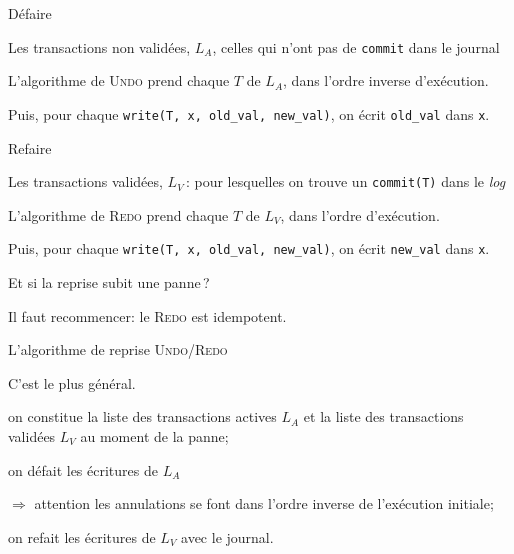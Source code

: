 \documentclass[aspectratio=169, handout]{beamer} %
\begin{document}
\begin{frame}{Défaire}

Les transactions non validées, $L_A$,  celles qui n'ont pas
de \texttt{commit} dans le journal

\vfill

L'algorithme de \textsc{Undo} prend chaque $T$ de $L_A$, 
\alert{dans l'ordre inverse d'exécution}.

\vfill

Puis, pour chaque \texttt{write(T, x, old\_val, new\_val)}, on écrit
\texttt{old\_val} dans \texttt{x}.

\end{frame}

\begin{frame}{Refaire}

Les transactions validées, $L_V$\,: 
pour lesquelles on trouve un \texttt{commit(T)} dans le \textit{log}

\vfill

L'algorithme de \textsc{Redo} prend chaque $T$ de $L_V$, 
\alert{dans l'ordre d'exécution}.

\vfill

Puis, pour chaque \texttt{write(T, x, old\_val, new\_val)}, on écrit
\texttt{new\_val} dans \texttt{x}.

\vfill

\begin{blocgauche}
Et si la reprise subit une panne\,?

\smallskip

 Il faut recommencer:
le \textsc{Redo} est \alert{idempotent}.
\end{blocgauche}
\end{frame}





\begin{frame}{L'algorithme de reprise \textsc{Undo/Redo}}

C'est le plus général.

\begin{redbullet}
  \item on constitue la liste des transactions actives
       $L_A$ et la liste des transactions validées $L_V$
          au moment de la panne;

  \item on \alert{défait} les écritures de $L_A$ 
  
   $\Rightarrow$ attention
            les annulations se font dans l'ordre inverse de 
                l'exécution initiale;
                
   \item on \alert{refait} les écritures de $L_V$ avec le journal.
\end{redbullet}


\end{frame}
\end{document}

